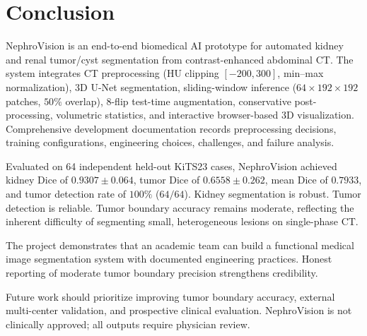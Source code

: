 \section{Conclusion}

NephroVision is an end-to-end biomedical AI prototype for automated kidney and renal tumor/cyst segmentation from contrast-enhanced abdominal CT. The system integrates CT preprocessing (HU clipping $[-200, 300]$, min--max normalization), 3D U-Net segmentation, sliding-window inference ($64 \times 192 \times 192$ patches, $50\%$ overlap), 8-flip test-time augmentation, conservative post-processing, volumetric statistics, and interactive browser-based 3D visualization. Comprehensive development documentation records preprocessing decisions, training configurations, engineering choices, challenges, and failure analysis.

Evaluated on 64 independent held-out KiTS23 cases, NephroVision achieved kidney Dice of $0.9307 \pm 0.064$, tumor Dice of $0.6558 \pm 0.262$, mean Dice of $0.7933$, and tumor detection rate of $100\%$ ($64/64$). Kidney segmentation is robust. Tumor detection is reliable. Tumor boundary accuracy remains moderate, reflecting the inherent difficulty of segmenting small, heterogeneous lesions on single-phase CT.

The project demonstrates that an academic team can build a functional medical image segmentation system with documented engineering practices. Honest reporting of moderate tumor boundary precision strengthens credibility.

Future work should prioritize improving tumor boundary accuracy, external multi-center validation, and prospective clinical evaluation. NephroVision is not clinically approved; all outputs require physician review.
